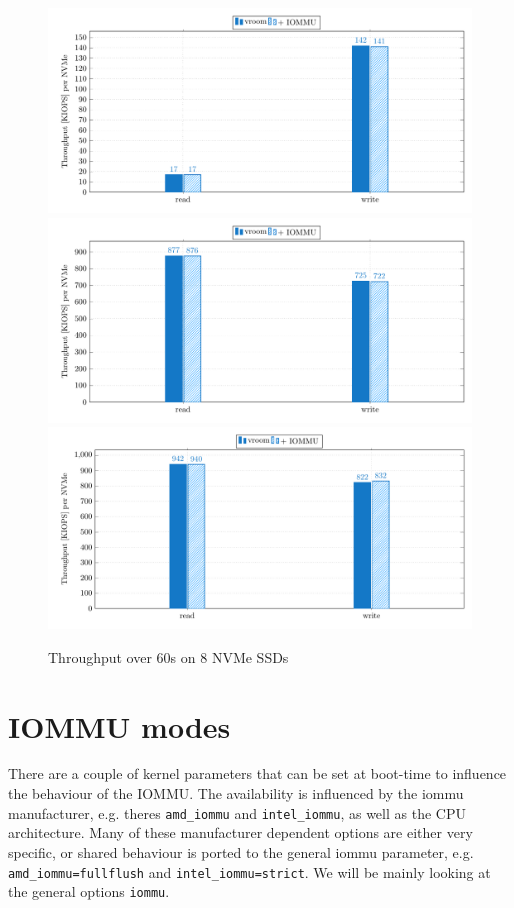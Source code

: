 \begin{figure}[H]
  \centering
   {\includegraphics[width=.7\textwidth]{figures/throughput_bar_qd1t1_8nvmes} }
   {\includegraphics[width=.7\textwidth]{figures/throughput_bar_qd32t4_8nvmes} }
   {\includegraphics[width=.7\textwidth]{figures/throughput_bar_qd128t16_8nvmes} }
  \caption{Throughput over 60s on 8 NVMe SSDs}
  \label{fig:throughput-bar-8n}
\end{figure}

\section{IOMMU modes}
There are a couple of kernel parameters that can be set at boot-time to influence the behaviour of the IOMMU. The availability is influenced by the iommu manufacturer, e.g. theres \texttt{amd\_iommu} and \texttt{intel\_iommu}, as well as the CPU architecture. Many of these manufacturer dependent options are either very specific, or shared behaviour is ported to the general iommu parameter, e.g. \texttt{amd\_iommu=fullflush} and \texttt{intel\_iommu=strict}. We will be mainly looking at the general options \texttt{iommu}.

